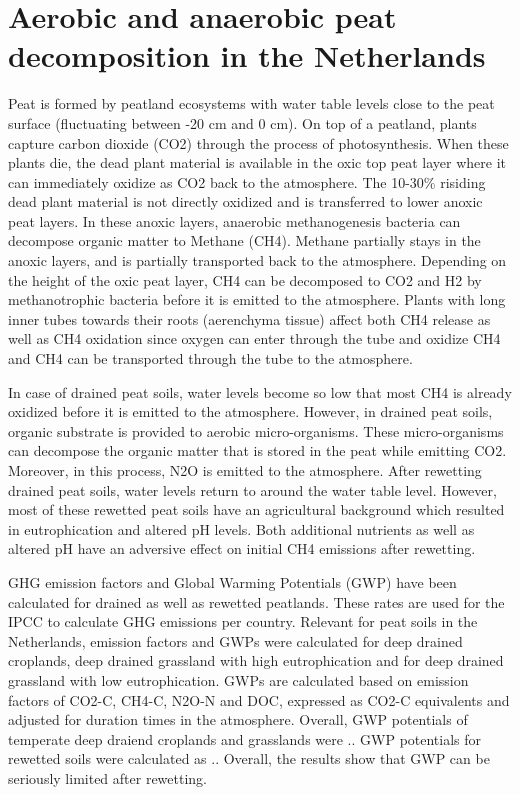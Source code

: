 {\section{Aerobic and anaerobic peat decomposition in the Netherlands}
Peat is formed by peatland ecosystems with water table levels close to the peat surface (fluctuating between -20 cm and 0 cm). On top of a peatland, plants capture carbon dioxide (CO2) through the process of photosynthesis. When these plants die, the dead plant material is available in the oxic top peat layer where it can immediately oxidize as CO2 back to the atmosphere. The 10-30\% risiding dead plant material is not directly oxidized and is transferred to lower anoxic peat layers. In these anoxic layers, anaerobic methanogenesis bacteria can decompose organic matter to Methane (CH4). Methane partially stays in the anoxic layers, and is partially transported back to the atmosphere. Depending on the height of the oxic peat layer, CH4 can be decomposed to CO2 and H2 by methanotrophic bacteria before it is emitted to the atmosphere. Plants with long inner tubes towards their roots (aerenchyma tissue) affect both CH4 release as well as CH4 oxidation since oxygen can enter through the tube and oxidize CH4 and CH4 can be transported through the tube to the atmosphere. 

In case of drained peat soils, water levels become so low that most CH4 is already oxidized before it is emitted to the atmosphere. However, in drained peat soils, organic substrate is provided to aerobic micro-organisms. These micro-organisms can decompose the organic matter that is stored in the peat while emitting CO2. Moreover, in this process, N2O is emitted to the atmosphere. After rewetting drained peat soils, water levels return to around the water table level. However, most of these rewetted peat soils have an agricultural background which resulted in eutrophication and altered pH levels. Both additional nutrients as well as altered pH have an adversive effect on initial CH4 emissions after rewetting. 

GHG emission factors and Global Warming Potentials (GWP) have been calculated for drained as well as rewetted peatlands. These rates are used for the IPCC to calculate GHG emissions per country. Relevant for peat soils in the Netherlands, emission factors and GWPs were calculated for deep drained croplands, deep drained grassland with high eutrophication and for deep drained grassland with low eutrophication. GWPs are calculated based on emission factors of CO2-C, CH4-C, N2O-N and DOC, expressed as CO2-C equivalents and adjusted for duration times in the atmosphere. Overall, GWP potentials of temperate deep draiend croplands and grasslands were .. GWP potentials for rewetted soils were calculated as .. Overall, the results show that GWP can be seriously limited after rewetting. 

}
